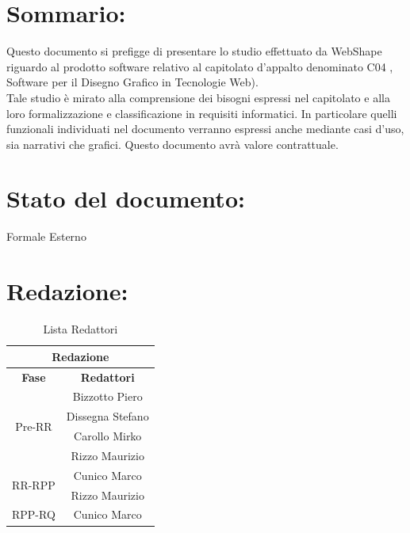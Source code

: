 \section*{\LARGE Sommario:} %
Questo documento si prefigge di presentare lo studio effettuato da WebShape riguardo al prodotto software relativo al capitolato d'appalto denominato C04 {\ajax}, Software per il Disegno Grafico in Tecnologie Web).\\
Tale studio \`e mirato alla comprensione dei bisogni espressi nel capitolato e alla loro formalizzazione e classificazione in requisiti informatici. In particolare quelli funzionali individuati nel documento verranno espressi anche mediante casi d'uso, sia narrativi che grafici. Questo documento avr\`a valore contrattuale.

\section*{\LARGE Stato del documento:}
	Formale Esterno
\hangindent=0pt

\section*{\LARGE Redazione:}
	\begin{table}[!h]
		\begin{center}
			\begin{tabular}
				{|c|c|}
				\hline
				\multicolumn{2}{|c|}{ \textbf{Redazione} } \\
				\hline
				\textbf{Fase} & \textbf{Redattori} \\
				\hline
				\multirow{4}{*}{Pre-RR} & Bizzotto Piero\\
										& Dissegna Stefano\\
										& Carollo Mirko\\
                                        & Rizzo Maurizio\\
				\hline
				\multirow{2}{*}{RR-RPP} & Cunico Marco\\
                                        & Rizzo Maurizio\\
										
				\hline
				\multirow{1}{*}{RPP-RQ} & Cunico Marco\\
                                      
													\hline
			\end{tabular}
			\caption{Lista Redattori} %
			\label{tabredazione}
		\end{center}
	\end{table}	

